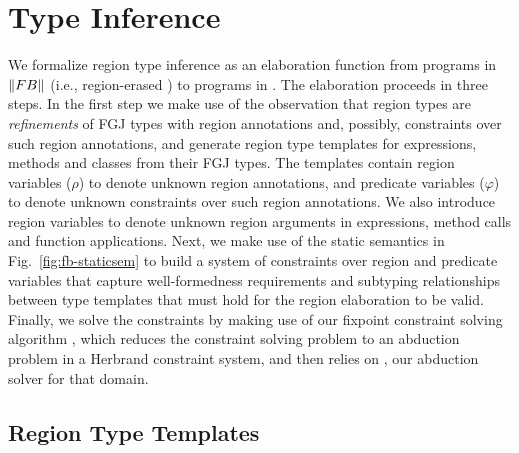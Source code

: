 \section{Type Inference}
\label{sec:type-inference}

We formalize region type inference as an elaboration function from
programs in $\left\| {\sc FB} \right\|$ (i.e., region-erased \FB) to programs in
\FB.  The elaboration proceeds in three steps. In the first step we
make use of the observation that region types are \emph{refinements}
of FGJ types with region annotations and, possibly, constraints over
such region annotations, and generate region type templates for
expressions, methods and classes from their FGJ types. The templates
contain region variables ($\rho$) to denote unknown region
annotations, and predicate variables ($\varphi$) to denote unknown
constraints over such region annotations. We also introduce region
variables to denote unknown region arguments in  expressions,
method calls and function applications. Next, we make use of the
static semantics in Fig.~\ref{fig:fb-staticsem} to build a system of
constraints over region and predicate variables that capture
well-formedness requirements and subtyping relationships between type
templates that must hold for the region elaboration to be valid.
Finally, we solve the constraints by making use of our fixpoint
constraint solving algorithm \csolvestar, which reduces the
constraint solving problem to an abduction problem in a Herbrand
constraint system, and then relies on \csolve, our abduction
solver for that domain. 

\subsection{Region Type Templates}

